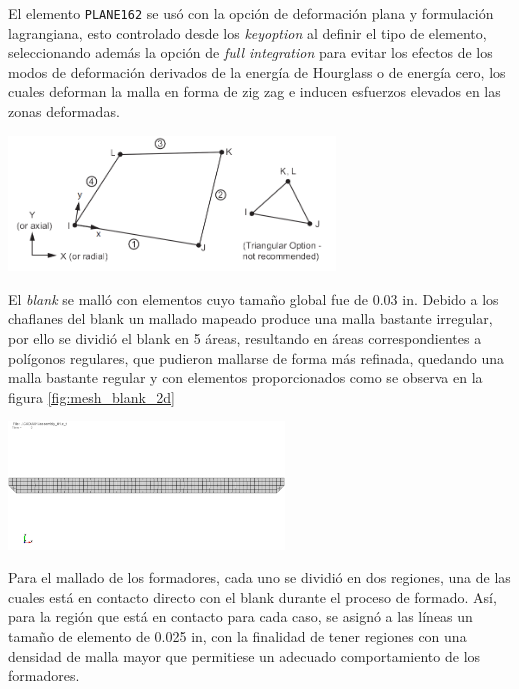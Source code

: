 El elemento \texttt{PLANE162} se usó con la opción de deformación plana y formulación lagrangiana, esto controlado 
desde los \textit{keyoption} al definir el tipo de elemento, seleccionando además la opción de \textit{full integration} 
para evitar los efectos de los modos de deformación derivados de la energía de Hourglass o de energía cero, los cuales 
deforman la malla en forma de zig zag e inducen esfuerzos elevados en las zonas deformadas.\\

\begin{center}
\includegraphics[width=0.65\textwidth]{src/ch3/plane162.png}
\label{fig:plane162}
\end{center}

El \textit{blank} se malló con elementos cuyo tamaño global fue de 0.03 in. Debido a los chaflanes del blank 
un mallado mapeado produce una malla bastante irregular, por ello se dividió el blank en 5 áreas, resultando 
en áreas correspondientes a polígonos regulares, que pudieron mallarse de forma más refinada, quedando una malla 
bastante regular y con elementos proporcionados como se observa en la figura \ref{fig:mesh_blank_2d}

\begin{center}
\includegraphics[width=0.55\textwidth]{src/ch3/mesh_blank_2d.png}
\label{fig:mesh_blank_2d}
\end{center}

Para el mallado de los formadores, cada uno se dividió en dos regiones, una de las cuales está en contacto directo 
con el blank durante el proceso de formado. Así, para la región que está en contacto para cada caso, se asignó 
a las líneas un tamaño de elemento de 0.025 in, con la finalidad de tener regiones con una densidad de malla mayor 
que permitiese un adecuado comportamiento de los formadores. \\

